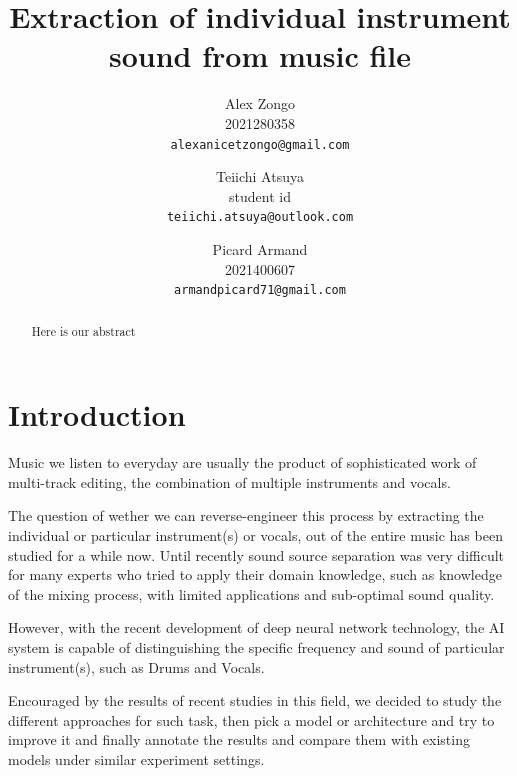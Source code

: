 \documentclass[final]{cvpr}
\begin{document}
\title{Extraction of individual instrument sound from music file}

\author{Alex Zongo\\
2021280358\\
{\tt\small alexanicetzongo@gmail.com}
\and
Teiichi Atsuya\\
student id\\
{\tt\small teiichi.atsuya@outlook.com}
\and
Picard Armand\\
2021400607\\
{\tt\small armandpicard71@gmail.com}
}

\maketitle


\begin{abstract}
Here is our abstract
\end{abstract}

\section{Introduction}

Music we listen to everyday are usually the product of sophisticated work of multi-track editing, the combination of multiple instruments and vocals. 

The question of wether we can reverse-engineer this process by extracting the individual or particular instrument(s) or vocals, out of the entire music has been studied for a while now. Until recently sound source separation was very difficult for many experts who tried to apply their domain knowledge, such as knowledge of the mixing process, with limited applications and sub-optimal sound quality. 

However, with the recent development of deep neural network technology, the AI system is capable of distinguishing the specific frequency and sound of particular instrument(s), such as Drums and Vocals. 

Encouraged by the results of recent studies in this field, we decided to study the different approaches for such task, then pick a model or architecture and try to improve it and finally annotate the results and compare them with existing models under similar experiment settings.
\end{document}
